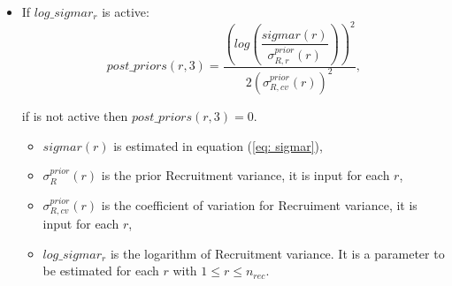 \documentclass{article}
\begin{document}
    \begin{itemize}
        \item If $log\_sigmar_r$ is active:
        \begin{equation}
            post\_priors(r,3) = \dfrac{\left(log\left(\dfrac{sigmar(r)}{\sigma_{R,r}^{prior}(r)}\right)\right)^2}{{2(\sigma_{R,cv}^{prior}(r))^2}},
        \end{equation}
        
        if is not active then $post\_priors(r,3)=0$.
        
        \begin{itemize}
            \item $sigmar(r)$ is estimated in equation (\ref{eq: sigmar}),
            
            \item $\sigma_{R}^{prior}(r)$ is the prior Recruitment variance, it is input for each $r$,
            
            \item $\sigma_{R,cv}^{prior}(r)$ is the coefficient of variation for Recruiment variance, it is input for each $r$,
            
            \item $log\_sigmar_r$ is the logarithm of Recruitment variance. It is  a parameter to be estimated for each $r$ with $1\leq r \leq n_{rec}$.
        \end{itemize}
    \end{itemize}
\end{document}
